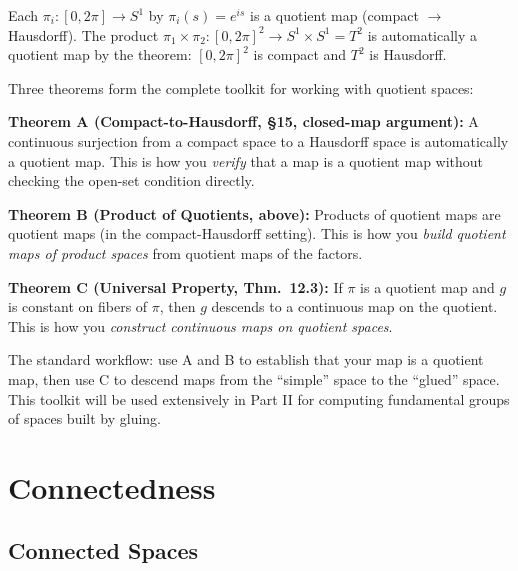 \documentclass[11pt]{report}
\begin{document}
\begin{exbox}
Each $\pi_i: [0, 2\pi] \to S^1$ by $\pi_i(s) = e^{is}$ is a quotient map (compact $\to$ Hausdorff). The product $\pi_1 \times \pi_2: [0, 2\pi]^2 \to S^1 \times S^1 = T^2$ is automatically a quotient map by the theorem: $[0, 2\pi]^2$ is compact and $T^2$ is Hausdorff.
\end{exbox}

\begin{rembox}
Three theorems form the complete toolkit for working with quotient spaces:

\textbf{Theorem A (Compact-to-Hausdorff, \S 15, closed-map argument):} A continuous surjection from a compact space to a Hausdorff space is automatically a quotient map. This is how you \emph{verify} that a map is a quotient map without checking the open-set condition directly.

\textbf{Theorem B (Product of Quotients, above):} Products of quotient maps are quotient maps (in the compact-Hausdorff setting). This is how you \emph{build quotient maps of product spaces} from quotient maps of the factors.

\textbf{Theorem C (Universal Property, Thm.\ 12.3):} If $\pi$ is a quotient map and $g$ is constant on fibers of $\pi$, then $g$ descends to a continuous map on the quotient. This is how you \emph{construct continuous maps on quotient spaces}.

The standard workflow: use A and B to establish that your map is a quotient map, then use C to descend maps from the ``simple'' space to the ``glued'' space. This toolkit will be used extensively in Part II for computing fundamental groups of spaces built by gluing.
\end{rembox}

\chapter{Connectedness}

\section{Connected Spaces}
\end{document}
